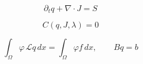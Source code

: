 \[
\partial_t q+\nabla\cdot J=S
\]

\[
C(q,J,\lambda)=0
\]

\[
\int_\Omega \varphi\,\mathcal L q\,dx=\int_\Omega \varphi f\,dx,\qquad Bq=b
\]
